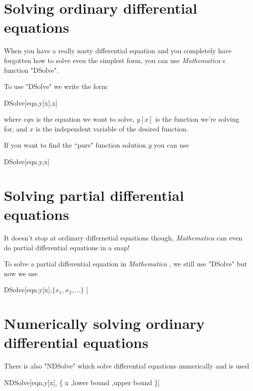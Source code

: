 \documentclass[11pt,letterpaper,twoside,titlepage]{report}
\newcommand{\Mathematica}{\textit{Mathematica} }
\begin{document}
			\section{Solving ordinary differential equations}				
						
				When you have a really nasty differential equation and you completely have forgotten how to solve even the simplest form, you can use \Mathematica s function "DSolve".
						
				To use "DSolve" we write the form
						
				\begin{center} DSolve[eqn,y[x],x] \end{center}
						
				where $eqn$ is the equation we want to solve, $y[x]$ is the function we're solving for, and $x$ is the independent variable of the desired function.
				
				If you want to find the ``pure" function solution $y$ you can use
				
				\begin{center} DSolve[eqn,y,x] \end{center}

			\section{Solving partial differential equations}
						
				It doesn't stop at ordinary differnetial equations though, \Mathematica can even do partial differential equations in a snap!
							
				To solve a partial differential equation in \Mathematica, we still use "DSolve" but now we use
							
				\begin{center} DSolve[eqn,y[x],$\{ x_1, x_2, \dots \}$ ] \end{center}
							
			\section{Numerically solving ordinary differential equations}
							
				There is also "NDSolve" which solve differential equations numerically and is used 
						
				\begin{center} NDSolve[eqn,y[x], \{ x ,lower bound ,upper bound \}] \end{center}
					
\end{document}
